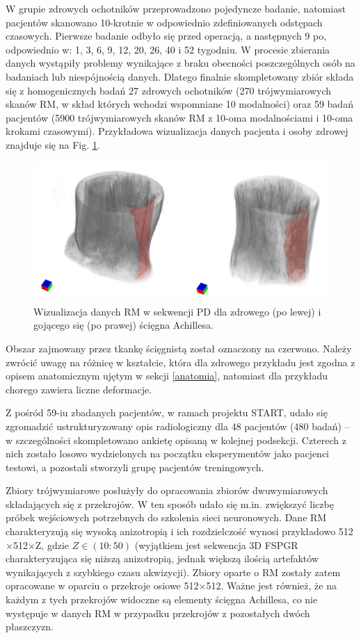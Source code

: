 W grupie zdrowych ochotników przeprowadzono pojedyncze badanie, natomiast pacjentów skanowano 10-krotnie w odpowiednio zdefiniowanych odstępach czasowych. Pierwsze badanie odbyło się przed operacją, a następnych 9 po, odpowiednio w: 1, 3, 6, 9, 12, 20, 26, 40 i 52 tygodniu. W procesie zbierania danych wystąpiły problemy wynikające z braku obecności poszczególnych osób na badaniach lub niespójnością danych. Dlatego finalnie skompletowany zbiór składa się z homogenicznych badań 27 zdrowych ochotników (270 trójwymiarowych skanów RM, w skład których wchodzi wspomniane 10 modalności) oraz 59 badań pacjentów (5900 trójwymiarowych skanów RM z 10-oma modalnościami i 10-oma krokami czasowymi). Przykładowa wizualizacja danych pacjenta i osoby zdrowej znajduje się na Fig. \ref{fig:MRI_sample}. 
\begin{figure}[h!]
	\includegraphics[width=\textwidth]{figures/Data_MRI_sample.png}
	\caption{Wizualizacja danych RM w sekwencji PD dla zdrowego (po lewej) i gojącego się (po prawej) ścięgna Achillesa.}
	 \label{fig:MRI_sample}
\end{figure}
Obszar zajmowany przez tkankę ścięgnistą został oznaczony na czerwono. Należy zwrócić uwagę na różnicę w kształcie, która dla zdrowego przykładu jest zgodna z opisem anatomicznym ujętym w sekcji \ref{anatomia}, natomiast dla przykładu chorego zawiera liczne deformacje. 

Z pośród 59-iu zbadanych pacjentów, w ramach projektu START, udało się zgromadzić ustrukturyzowany opis radiologiczny dla 48 pacjentów (480 badań) -- w szczególności skompletowano ankietę opisaną w kolejnej podsekcji. Czterech z nich zostało losowo wydzielonych na początku eksperymentów jako pacjenci testowi, a pozostali stworzyli grupę pacjentów treningowych.

Zbiory trójwymiarowe posłużyły do opracowania zbiorów dwuwymiarowych składających się z przekrojów. W ten sposób udało się m.in. zwiększyć liczbę próbek wejściowych potrzebnych do szkolenia sieci neuronowych. Dane RM charakteryzują się wysoką anizotropią i ich rozdzielczość wynosi przykładowo 512$\times$512$\times$Z, gdzie $Z\in(10:50)$ (wyjątkiem jest sekwencja 3D FSPGR charakteryzująca się niższą anizotropią, jednak większą ilością artefaktów wynikających z szybkiego czasu akwizycji). Zbiory oparte o RM zostały zatem opracowane w oparciu o przekroje osiowe 512$\times$512. Ważne jest również, że na każdym z tych przekrojów widoczne są elementy ścięgna Achillesa, co nie występuje w danych RM w przypadku przekrojów z pozostałych dwóch płaszczyzn.

